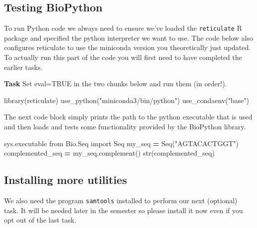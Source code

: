 \documentclass[
]{article}
\newenvironment{Shaded}{\begin{snugshade}}{\end{snugshade}}
\newcommand{\BuiltInTok}[1]{#1}
\newcommand{\FunctionTok}[1]{\textcolor[rgb]{0.00,0.00,0.00}{#1}}
\newcommand{\ImportTok}[1]{#1}
\newcommand{\NormalTok}[1]{#1}
\newcommand{\OperatorTok}[1]{\textcolor[rgb]{0.81,0.36,0.00}{\textbf{#1}}}
\newcommand{\StringTok}[1]{\textcolor[rgb]{0.31,0.60,0.02}{#1}}
\begin{document}
\hypertarget{testing-biopython}{%
\subsection{Testing BioPython}\label{testing-biopython}}

To run Python code we always need to ensure we've loaded the
\texttt{reticulate} R package and specified the python interpreter we
want to use. The code below also configures reticulate to use the
miniconda version you theoretically just updated. To actually run this
part of the code you will first need to have completed the earlier
tasks.

\textbf{Task} Set eval=TRUE in the two chunks below and run them (in
order!).

\begin{Shaded}
\begin{Highlighting}[]
\FunctionTok{library}\NormalTok{(reticulate)}
\FunctionTok{use\_python}\NormalTok{(}\StringTok{"miniconda3/bin/python"}\NormalTok{)}
\FunctionTok{use\_condaenv}\NormalTok{(}\StringTok{"base"}\NormalTok{)}
\end{Highlighting}
\end{Shaded}

The next code block simply prints the path to the python executable that
is used and then loads and tests some functionality provided by the
BioPython library.

\begin{Shaded}
\begin{Highlighting}[]
\NormalTok{sys.executable}
\ImportTok{from}\NormalTok{ Bio.Seq }\ImportTok{import}\NormalTok{ Seq}
\NormalTok{my\_seq }\OperatorTok{=}\NormalTok{ Seq(}\StringTok{"AGTACACTGGT"}\NormalTok{)}
\NormalTok{complemented\_seq }\OperatorTok{=}\NormalTok{ my\_seq.complement()}
\BuiltInTok{str}\NormalTok{(complemented\_seq)}
\end{Highlighting}
\end{Shaded}

\hypertarget{installing-more-utilities}{%
\subsection{Installing more utilities}\label{installing-more-utilities}}

We also need the program \texttt{samtools} installed to perform our next
(optional) task. It will be needed later in the semester so please
install it now even if you opt out of the last task.
\end{document}
